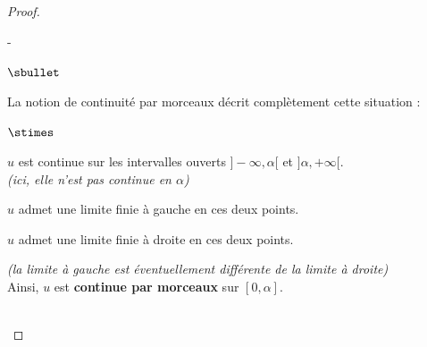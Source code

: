 \documentclass[11pt]{article}%
\begin{document}
\begin{proof}
\begin{remarkL}{.97}
\begin{noliste}{-}
\begin{noliste}{$\sbullet$}
        \item La notion de continuité par morceaux décrit 
	complètement cette situation :
	\end{noliste}
          \begin{liste}{$\stimes$}
          \item $u$ est continue sur les intervalles ouverts
            $]-\infty, \alpha[$ et $]\alpha, +\infty[$. \\
	    {\it(ici, elle n'est pas continue en $\alpha$)}
          \item $u$ admet une limite finie à gauche en ces deux
            points.
          \item $u$ admet une limite finie à droite en ces deux
            points.
          \end{liste}
          {\it (la limite à gauche est éventuellement différente de la
            limite à droite)}\\
          Ainsi, $u$ est {\bf continue par morceaux} sur $[0,\alpha]$.
      \end{noliste}
      \end{remarkL}~\\[-1.4cm]

\end{proof}
\end{document}

